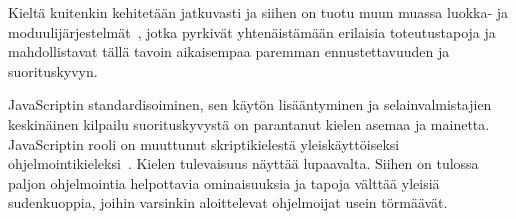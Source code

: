 Kieltä kuitenkin kehitetään jatkuvasti ja siihen on tuotu muun muassa luokka- ja moduulijärjestelmät~\cite[14.5.~ja~15.2.]{es6}, jotka pyrkivät yhtenäistämään erilaisia toteutustapoja ja mahdollistavat tällä tavoin aikaisempaa paremman ennustettavuuden ja suorituskyvyn.

JavaScriptin standardisoiminen, sen käytön lisääntyminen ja selainvalmistajien keskinäinen kilpailu suorituskyvystä on parantanut kielen asemaa ja mainetta. JavaScriptin rooli on muuttunut skriptikielestä yleiskäyttöiseksi ohjelmointikieleksi~\cite[4.]{es6}. Kielen tulevaisuus näyttää lupaavalta. Siihen on tulossa paljon ohjelmointia helpottavia ominaisuuksia ja tapoja välttää yleisiä sudenkuoppia, joihin varsinkin aloittelevat ohjelmoijat usein törmäävät.